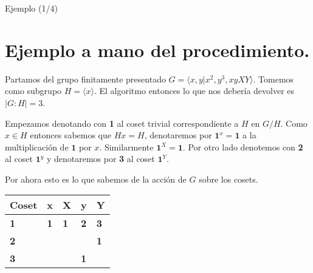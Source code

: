 \documentclass[aspectratio=169, 9pt]{beamer}
\newcommand{\fp}{finitamente presentado }
\begin{document}

\begin{frame}[fragile]{Ejemplo (1/4)}
	\section{Ejemplo a mano del procedimiento.}
	Partamos del grupo \fp $G = \langle x, y | x^2, y^3, xyXY \rangle$.
	\pause
	Tomemos como subgrupo $H = \langle x \rangle$.
	\pause
	El algoritmo entonces lo que nos debería devolver es $|G:H| = 3$.
	\pause
	\medskip
	
	
	Empezamos denotando con \textbf{1} al coset trivial correspondiente a $H$ en $G/H$.
	\pause 
	Como $x \in H$ entonces sabemos que $Hx = H$, denotaremos por $\textbf{1}^x = \textbf{1}$ a la multiplicación de $\textbf{1}$ por $x$.
	Similarmente $\textbf{1}^{X} = \textbf{1}$.
	\pause
	Por otro lado denotemos con \textbf{2} al coset $\textbf{1}^y$ y denotaremos por \textbf{3} al coset $\textbf{1}^{Y}$.
	\pause
	
	Por ahora esto es lo que sabemos de la acción de $G$ sobre los cosets.
	\begin{table}[]
		\begin{tabular}{|l|l|l|l|l|}
			\hline
			Coset     & x          & X          & y          & Y          \\ \hline
			\textbf{1} & \textbf{1} & \textbf{1} & \textbf{2} & \textbf{3} \\ \hline
			\textbf{2} &            &            &            &  \textbf{1}          \\ \hline
			\textbf{3} &            &            &     \textbf{1}       &            \\ \hline
		\end{tabular}
	\end{table}
\end{frame}
\end{document}
